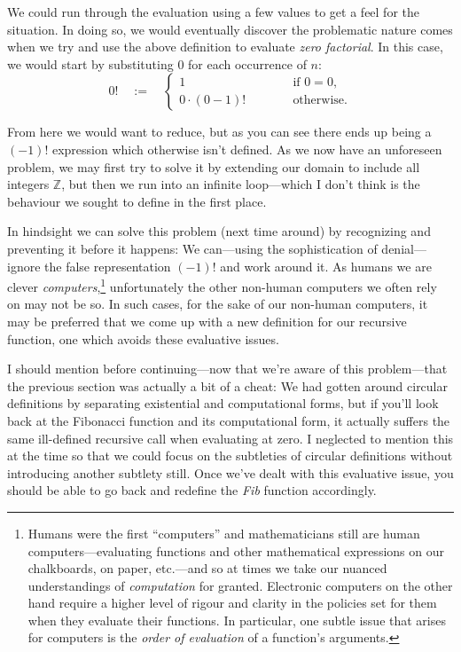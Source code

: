 \documentclass[twoside]{article}
\begin{document}
We could run through the evaluation using a few values to get a feel for the situation. In doing so, we would
eventually discover the problematic nature comes when we try and use the above definition to evaluate
\emph{zero factorial}. In this case, we would start by substituting $ 0 $ for each occurrence of $ n $:
$$ 0! \quad := \quad \left\{\begin{array}{ll}
1 & \qquad \hspace{1em} \mbox{if } 0 = 0,			\\
0 \cdot (0-1)! & \qquad \hspace{1em} \mbox{otherwise.}
\end{array}\right. $$

From here we would want to reduce, but as you can see there ends up being a $ (-1)! $ expression which otherwise
isn't defined. As we now have an unforeseen problem, we may first try to solve it by extending our domain to include
all integers $ \mathbb{Z} $, but then we run into an infinite loop---which I don't think is the behaviour
we sought to define in the first place.

In hindsight we can solve this problem (next time around) by recognizing and preventing it before it happens:
We can---using the sophistication of denial---ignore the false representation $ (-1)! $ and work around it.
As humans we are clever \emph{computers},\footnote{Humans were the first ``computers'' and mathematicians
still are human computers---evaluating functions and other mathematical expressions on our chalkboards,
on paper, etc.---and so at times we take our nuanced understandings of \emph{computation} for granted.
Electronic computers on the other hand require a higher level of rigour and clarity in the policies set
for them when they evaluate their functions. In particular, one subtle issue that arises for computers
is the \emph{order of evaluation} of a function's arguments.} unfortunately the other non-human computers
we often rely on may not be so. In such cases, for the sake of our non-human computers, it may be preferred
that we come up with a new definition for our recursive function, one which avoids these evaluative issues.

I should mention before continuing---now that we're aware of this problem---that the previous section was actually
a bit of a cheat: We had gotten around circular definitions by separating existential and computational forms,
but if you'll look back at the Fibonacci function and its computational form, it actually suffers the same ill-defined
recursive call when evaluating at zero. I neglected to mention this at the time so that we could focus on the
subtleties of circular definitions without introducing another subtlety still. Once we've dealt with this
evaluative issue, you should be able to go back and redefine the \emph{Fib} function accordingly.
\end{document}
